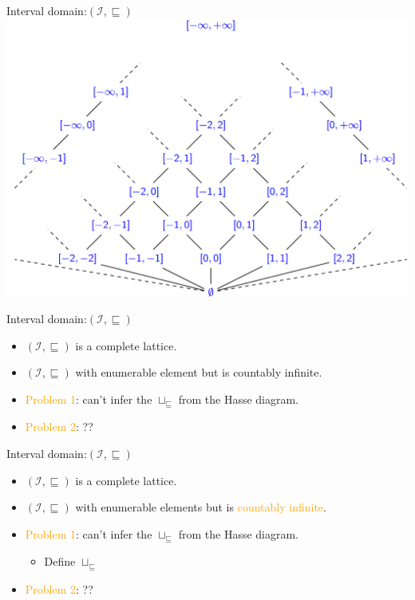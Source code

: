 \begin{frame}{Interval domain:$(\mathcal{I}, \sqsubseteq )$}\
\centering \includegraphics[scale=0.45]{content/images/static-analysis/interval.png}
\end{frame}

\begin{frame}{Interval domain:$(\mathcal{I}, \sqsubseteq )$}
\begin{itemize}
\item $(\mathcal{I}, \sqsubseteq )$ is a complete lattice.
\item $(\mathcal{I}, \sqsubseteq )$ with enumerable element but is countably infinite.
\item \textcolor{orange}{Problem 1}: can't infer the $\sqcup_{\scriptscriptstyle \sqsubseteq}$ from the Hasse diagram.
\item \textcolor{orange}{Problem 2}: ??
\end{itemize}
\end{frame}


\begin{frame}{Interval domain:$(\mathcal{I}, \sqsubseteq )$}
\begin{itemize}
	\item $(\mathcal{I}, \sqsubseteq )$ is a complete lattice.
	\item $(\mathcal{I}, \sqsubseteq )$ with enumerable elements but is \textcolor{orange}{countably infinite}.
	\item \textcolor{orange}{Problem 1}: can't infer the $\sqcup_{\scriptscriptstyle \sqsubseteq}$ from the Hasse diagram.
	\begin{itemize}
		\item Define $\sqcup_{\scriptscriptstyle \sqsubseteq}$
   \end{itemize}
	\item \textcolor{orange}{Problem 2}: ??
\end{itemize}
\end{frame}


